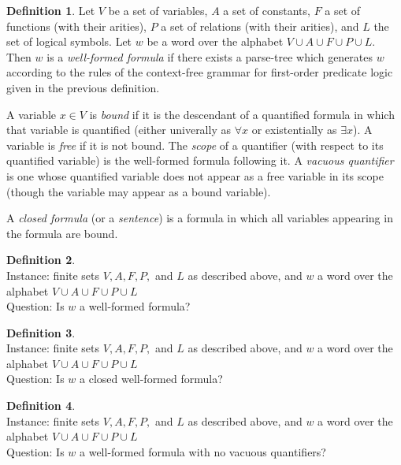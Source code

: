 \documentclass[draft]{article}
\theoremstyle{remark} \newtheorem{technicality}{Technical note}
\theoremstyle{definition} \newtheorem{definition}{Definition}
\newenvironment{langdef}[1]{\begin{definition}{\lang{#1}}}{\end{definition}}
\newenvironment{instance}{\\Instance:}{}
\newenvironment{question}{\\Question:}{}
\begin{document}
\begin{definition}
  Let $V$ be a set of variables, $A$ a set of constants, $F$ a set of functions (with their arities), $P$ a set of relations (with their arities), and $L$ the set of logical symbols.
  Let $w$ be a word over the alphabet $V\cup A\cup F\cup P\cup L$.
  Then $w$ is a \emph{well-formed formula} if there exists a parse-tree which generates $w$ according to the rules of the context-free grammar for first-order predicate logic given in the previous definition.

  A variable $x\in V$ is \emph{bound} if it is the descendant of a quantified formula in which that variable is quantified (either univerally as $\forall x$ or existentially as $\exists x$).
  A variable is \emph{free} if it is not bound.
  The \emph{scope} of a quantifier (with respect to its quantified variable) is the well-formed formula following it.
  A \emph{vacuous quantifier} is one whose quantified variable does not appear as a free variable in its scope (though the variable may appear as a bound variable).

  A \emph{closed formula} (or a \emph{sentence}) is a formula in which all variables appearing in the formula are bound.
\end{definition}

\begin{langdef}{PARSEABLE}
  \begin{instance}
    finite sets $V, A, F, P,$ and $L$ as described above, and $w$ a word over the alphabet $V\cup A\cup F\cup P\cup L$
  \end{instance}
  \begin{question}
    Is $w$ a well-formed formula?
  \end{question}
\end{langdef}

\begin{langdef}{CLOSED}
  \begin{instance}
    finite sets $V, A, F, P,$ and $L$ as described above, and $w$ a word over the alphabet $V\cup A\cup F\cup P\cup L$
  \end{instance}
  \begin{question}
    Is $w$ a closed well-formed formula?
  \end{question}
\end{langdef}

\begin{langdef}{NVQ}
  \begin{instance}
    finite sets $V, A, F, P,$ and $L$ as described above, and $w$ a word over the alphabet $V\cup A\cup F\cup P\cup L$
  \end{instance}
  \begin{question}
    Is $w$ a well-formed formula with no vacuous quantifiers?
  \end{question}
\end{langdef}
\end{document}
